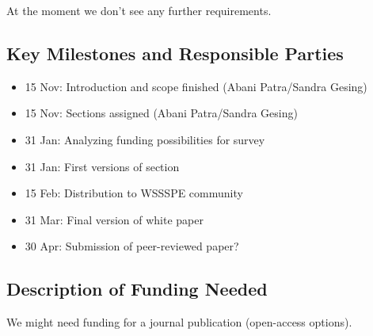 At the moment we don't see any further requirements.

\subsection{Key Milestones and Responsible Parties}
\begin{itemize}
\item 15 Nov: Introduction and scope finished (Abani Patra/Sandra Gesing)
\item 15 Nov: Sections assigned (Abani Patra/Sandra Gesing)
\item 31 Jan: Analyzing funding possibilities for survey
\item 31 Jan: First versions of section
\item 15 Feb: Distribution to WSSSPE community
\item 31 Mar: Final version of white paper
\item 30 Apr: Submission of peer-reviewed paper?
\end{itemize}

\subsection{Description of Funding Needed}
We might need funding for a journal publication (open-access options).
